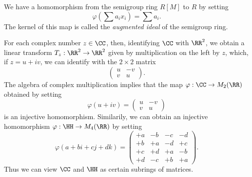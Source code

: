 \begin{example}
    We have a homomorphism from the semigroup ring $R[M]$ to $R$ by setting
    \[ \varphi \left(\sum a_i x_i \right) = \sum a_i. \]
    The kernel of this map is called the \emph{augmented ideal} of the semigroup ring.
\end{example}

\begin{example}
    For each complex number $z \in \CC$, then, identifying $\CC$ with $\RR^2$, we obtain a linear transform $T_z: \RR^2 \to \RR^2$ given by multiplication on the left by $z$, which, if $z = u + iv$, we can identify with the $2 \times 2$ matrix
    \[ \begin{pmatrix} u & -v \\ v & u \end{pmatrix}. \]
    The algebra of complex multiplication implies that the map $\varphi: \CC \to M_2(\RR)$ obtained by setting
    \[ \varphi(u + iv) = \begin{pmatrix} u & -v \\ v & u \end{pmatrix} \]
    is an injective homomorphism. Similarily, we can obtain an injective homomorphism $\varphi: \HH \to M_4(\RR)$ by setting
    \[ \varphi(a + bi + cj + dk) = \begin{pmatrix} +a & -b & -c & -d \\ +b & +a & -d & +c \\ +c & +d & +a & -b \\ +d & -c & +b & +a \end{pmatrix}. \]
    Thus we can view $\CC$ and $\HH$ as certain subrings of matrices.


\end{example}
